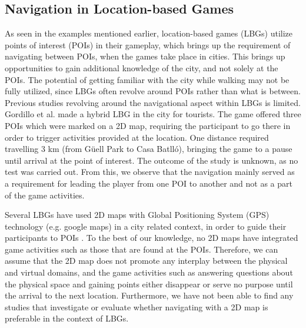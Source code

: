 \subsection{Navigation in Location-based Games}
As seen in the examples mentioned earlier, location-based games (LBGs) utilize points of interest (POIs) in their gameplay, which brings up the requirement of navigating between POIs, when the games take place in cities. This brings up opportunities to gain additional knowledge of the city, and not solely at the POIs. The potential of getting familiar with the city while walking may not be fully utilized, since LBGs often revolve around POIs rather than what is between. Previous studies revolving around the navigational aspect within LBGs is limited. 
Gordillo et al. made a hybrid LBG in the city for tourists\cite{Learninggamified}. The game offered three POIs which were marked on a 2D map, requiring the participant to go there in order to trigger activities provided at the location.  One distance required travelling 3 km (from Güell Park to Casa Batlló), bringing the game to a pause until arrival at the point of interest.  The outcome of the study is unknown, as no test was carried out. From this, we observe that the navigation mainly served as a requirement for leading the player from one POI to another and not as a part of the game activities.

Several LBGs have used 2D maps with Global Positioning System (GPS) technology (e.g. google maps) in a city related context, in order to guide their participants to POIs \cite{TheoreticalAndMethod, Learninggamified, knowcity, Carrigy:2010:DEP:1868914.1868929, GamingTourism, Procyk:2013:GLG:2468356.2468550, Bell:2009:ESN:1518701.1518723}. To the best of our knowledge, no 2D maps have integrated game activities such as those that are found at the POIs. Therefore, we can assume that the 2D map does not promote any interplay between the physical and virtual domains, and the game activities such as answering questions about the physical space and gaining points either disappear or serve no purpose until the arrival to the next location. Furthermore, we have not been able to find any studies that investigate or evaluate whether navigating with a 2D map is preferable in the context of LBGs.

